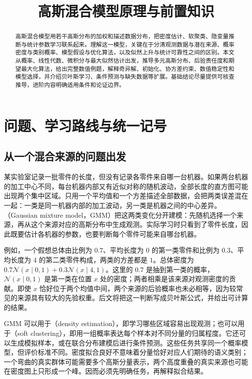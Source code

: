 \documentclass[UTF8]{ctexart}
\title{高斯混合模型原理与前置知识}
\author{}
\date{}
\begin{document}
\maketitle

\begin{abstract}
高斯混合模型用若干高斯分布的加权和描述数据分布，把密度估计、软聚类、隐变量推断与统计参数学习联系起来。理解这一模型，关键在于分清观测数据与潜在来源、概率密度与类别概率、模型假设与优化算法，以及似然上升与统计可靠性之间的区别。本文从概率、线性代数、微积分与最大似然估计出发，推导多元高斯分布、后验责任度和期望最大化算法，给出完整数值例题，解释奇异解、初始化、协方差约束、数值稳定性和模型选择，并介绍贝叶斯学习、条件预测与缺失数据等扩展。基础结论尽量提供可核查推导，进阶内容明确适用条件和论证边界。
\end{abstract}
\tableofcontents

\section{问题、学习路线与统一记号}
\label{sec:gmm-introduction}

\subsection{从一个混合来源的问题出发}
某实验室记录一批零件的长度，但没有记录各零件来自哪一台机器。如果两台机器的加工中心不同，每台机器内部又有近似对称的随机波动，全部长度的直方图可能出现两个集中区域。只用一个平均值和一个方差描述全部数据，会把两类误差混在一起：一类是同一机器内部的加工波动，另一类是机器之间的中心差异。（Gaussian mixture model，GMM）把这两类变化分开建模：先随机选择一个来源，再从这个来源对应的高斯分布中生成观测。实际学习时只看到了零件长度，因此既要估计各机器的参数，也要判断每个零件可能来自哪台机器。

例如，一个假想总体由比例为 $0.7$、平均长度为 $0$ 的第一类零件和比例为 $0.3$、平均长度为 $4$ 的第二类零件构成，两类的方差都是 $1$。总体密度为 $0.7\mathcal N(x\mid0,1)+0.3\mathcal N(x\mid4,1)$。这里的 $0.7$ 是抽到第一类的概率，$\mathcal N(x\mid0,1)$ 是第一类在位置 $x$ 处的密度；两者相乘是该来源对观测密度的贡献。即使 $x$ 恰好位于两个均值中间，两个来源的后验概率也未必相等，因为较常见的来源具有较大的先验权重。后文将把这一判断写成贝叶斯公式，并给出可计算的结果。

GMM 可以用于（density estimation），即学习哪些区域容易出现观测；也可以用于（soft clustering），即用一组概率表达每个样本对不同分量的归属程度。它还可以生成模拟样本，或在联合分布建模后进行条件预测。这些任务共享同一个概率模型，但评价标准不同。密度拟合良好不意味着分量恰好对应人们期待的语义类别；一个弯曲的真实群体可能需要多个高斯分量表示，两个高度重叠的真实来源也可能在密度图上只形成一个峰。因而必须先明确任务，再解释拟合结果。
\end{document}
